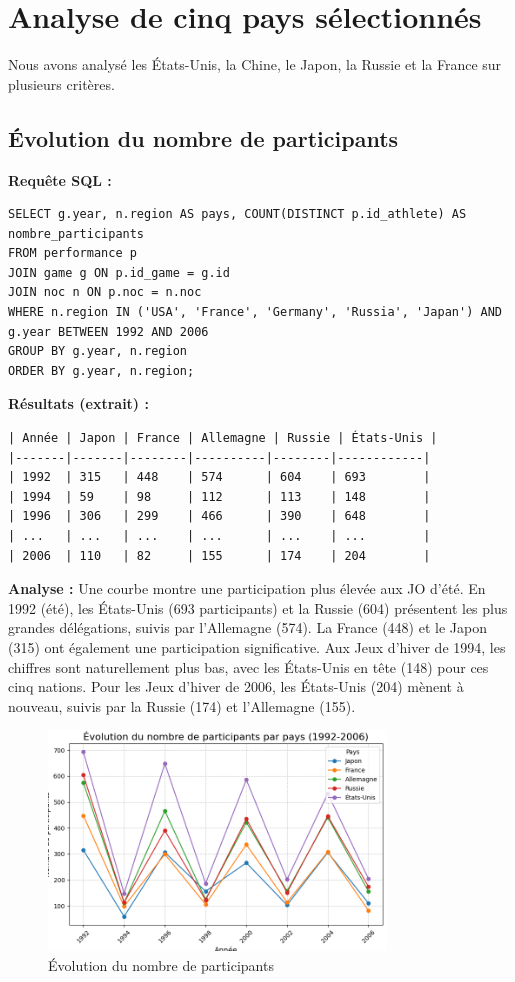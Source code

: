 \documentclass[fontsize=10pt,oneside]{scrreprt}
\begin{document}
\section{Analyse de cinq pays sélectionnés}
Nous avons analysé les États-Unis, la Chine, le Japon, la Russie et la France sur plusieurs critères.

\subsection{Évolution du nombre de participants}
\textbf{Requête SQL :}
\begin{verbatim}
SELECT g.year, n.region AS pays, COUNT(DISTINCT p.id_athlete) AS nombre_participants
FROM performance p
JOIN game g ON p.id_game = g.id
JOIN noc n ON p.noc = n.noc
WHERE n.region IN ('USA', 'France', 'Germany', 'Russia', 'Japan') AND g.year BETWEEN 1992 AND 2006
GROUP BY g.year, n.region
ORDER BY g.year, n.region;
\end{verbatim}
\textbf{Résultats (extrait) :}
\begin{verbatim}
| Année | Japon | France | Allemagne | Russie | États-Unis |
|-------|-------|--------|----------|--------|------------|
| 1992  | 315   | 448    | 574      | 604    | 693        |
| 1994  | 59    | 98     | 112      | 113    | 148        |
| 1996  | 306   | 299    | 466      | 390    | 648        |
| ...   | ...   | ...    | ...      | ...    | ...        |
| 2006  | 110   | 82     | 155      | 174    | 204        |
\end{verbatim}
\textbf{Analyse :} Une courbe montre une participation plus élevée aux JO d'été. En 1992 (été), les États-Unis (693 participants) et la Russie (604) présentent les plus grandes délégations, suivis par l'Allemagne (574). La France (448) et le Japon (315) ont également une participation significative. Aux Jeux d'hiver de 1994, les chiffres sont naturellement plus bas, avec les États-Unis en tête (148) pour ces cinq nations. Pour les Jeux d'hiver de 2006, les États-Unis (204) mènent à nouveau, suivis par la Russie (174) et l'Allemagne (155).
\begin{figure}[H]
    \centering
    \includegraphics[width=0.8\textwidth]{charts/3bi.png}
    \caption{Évolution du nombre de participants}
    \label{fig:evol_participants}
\end{figure}
\end{document}
